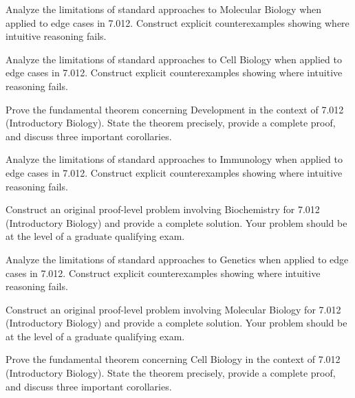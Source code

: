 \documentclass[12pt,a4paper]{exam}
\begin{document}
\begin{questions}
\vspace{0.3cm}

\question[5]
Analyze the limitations of standard approaches to Molecular Biology when applied to edge cases in 7.012. Construct explicit counterexamples showing where intuitive reasoning fails.

\vspace{0.3cm}

\question[7]
Analyze the limitations of standard approaches to Cell Biology when applied to edge cases in 7.012. Construct explicit counterexamples showing where intuitive reasoning fails.

\vspace{0.3cm}

\question[5]
Prove the fundamental theorem concerning Development in the context of 7.012 (Introductory Biology). State the theorem precisely, provide a complete proof, and discuss three important corollaries.

\vspace{0.3cm}

\question[4]
Analyze the limitations of standard approaches to Immunology when applied to edge cases in 7.012. Construct explicit counterexamples showing where intuitive reasoning fails.

\vspace{0.3cm}

\question[5]
Construct an original proof-level problem involving Biochemistry for 7.012 (Introductory Biology) and provide a complete solution. Your problem should be at the level of a graduate qualifying exam.

\vspace{0.3cm}

\question[3]
Analyze the limitations of standard approaches to Genetics when applied to edge cases in 7.012. Construct explicit counterexamples showing where intuitive reasoning fails.

\vspace{0.3cm}

\question[3]
Construct an original proof-level problem involving Molecular Biology for 7.012 (Introductory Biology) and provide a complete solution. Your problem should be at the level of a graduate qualifying exam.

\vspace{0.3cm}

\question[3]
Prove the fundamental theorem concerning Cell Biology in the context of 7.012 (Introductory Biology). State the theorem precisely, provide a complete proof, and discuss three important corollaries.


\end{questions}
\end{document}
